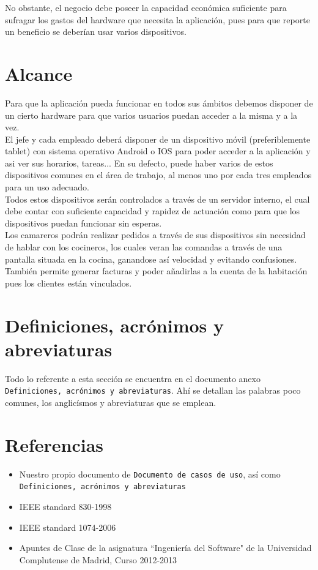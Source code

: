 \documentclass[spanish,a4paper,11pt, twoside]{report}	%
\begin{document}
No obstante, el negocio debe poseer la capacidad económica suficiente para sufragar los gastos del hardware que necesita la aplicación, pues para que reporte un beneficio se deberían usar varios dispositivos.

\section{Alcance}

Para que la aplicación pueda funcionar en todos sus ámbitos debemos disponer de un cierto hardware para que varios usuarios puedan acceder a la misma y a la vez.\\

 El jefe y cada empleado deberá disponer de un dispositivo móvil (preferiblemente tablet) con sistema operativo Android o IOS para poder acceder a la aplicación y asi ver sus horarios, tareas... En su defecto, puede haber varios de estos dispositivos comunes en el área de trabajo, al menos uno por cada tres empleados para un uso adecuado. \\

Todos estos dispositivos serán controlados a través de un servidor interno, el cual debe contar con suficiente capacidad y rapidez de actuación como para que los dispositivos puedan funcionar sin esperas.\\

Los camareros podrán realizar pedidos a través de sus dispositivos sin necesidad de hablar con los cocineros, los cuales veran las comandas a través de una pantalla situada en la cocina, ganandose así velocidad y evitando confusiones. También permite generar facturas y poder añadirlas a la cuenta de la habitación pues los clientes están vinculados.


\section{Definiciones, acrónimos y abreviaturas}

Todo lo referente a esta sección se encuentra en el documento anexo \texttt{Definiciones, acrónimos y abreviaturas}. Ahí se detallan las palabras poco comunes, los anglicísmos y abreviaturas que se emplean.

\section{Referencias}
	\begin{itemize}
		\item Nuestro propio documento de \texttt{Documento de casos de uso}, así como \\ \texttt{Definiciones, acrónimos y abreviaturas}
		\item  IEEE standard 830-1998
		\item IEEE standard 1074-2006
		\item Apuntes de Clase de la asignatura “Ingeniería del Software" de la Universidad Complutense de Madrid, Curso 2012-2013

	\end{itemize}
\end{document}
